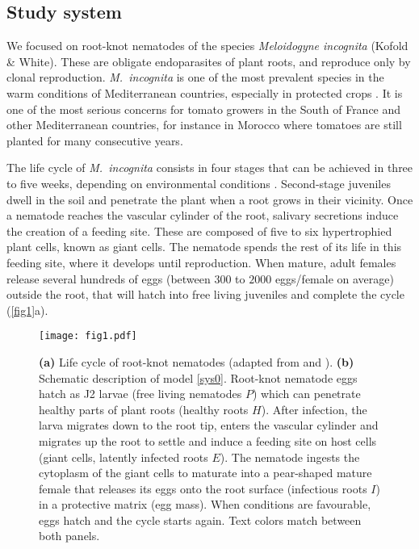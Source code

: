 {{{{\subsection{Study system}

We focused on root-knot nematodes of the species \textit{Meloidogyne
  incognita} (Kofold \& White). These are obligate endoparasites of
plant roots, and reproduce only by clonal reproduction. \textit{M.\
  incognita} is one of the most prevalent species in the warm
conditions of Mediterranean countries, especially in protected crops
\citep{Wesemael2011}. It is one of the most serious concerns for
tomato growers in the South of France and other Mediterranean
countries, for instance in Morocco where tomatoes are still
planted for many consecutive years.

The life cycle of \textit{M.\ incognita} consists in four stages that
can be achieved in three to five weeks, depending on environmental
conditions \citep{Abad2010}. Second-stage juveniles dwell in the soil
and penetrate the plant when a root grows in their vicinity. Once a
nematode reaches the vascular cylinder of the root, salivary
secretions induce the creation of a feeding site. These are composed
of five to six hypertrophied plant cells, known as giant cells. The
nematode spends the rest of its life in this feeding site, where it
develops until reproduction.  When mature, adult females release
several hundreds of eggs (between $300$ to $2000$ eggs/female on 
average) outside the root, that will hatch into
free living juveniles and complete the cycle
(\autoref{fig1}a).

\begin{figure}[ht]
  \centering 
   \texttt{[image: fig1.pdf]} 
  \caption[(a) Life cycle of root-knot nematodes
     and (b) Schematic description of model
      \eqref{sys0}.]{\textbf{(a)} Life cycle of root-knot nematodes
      (adapted from \citet{Williamson2003} and
      \citet{Abad2010}). \textbf{(b)} Schematic description of model
      \eqref{sys0}. Root-knot nematode eggs hatch as J2 larvae (free
      living nematodes $P$) which can penetrate healthy parts of plant
      roots (healthy roots $H$). After infection, the larva migrates
      down to the root tip, enters the vascular cylinder and migrates
      up the root to settle and induce a feeding site on host cells
      (giant cells, latently infected roots $E$). The nematode ingests
      the cytoplasm of the giant cells to maturate into a pear-shaped
      mature female that releases its eggs onto the root surface
      (infectious roots $I$) in a protective matrix (egg mass). When
      conditions are favourable, eggs hatch and the cycle starts
      again. Text colors match between both panels.}
  \label{fig1} 
\end{figure}

}}}}
